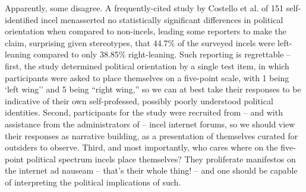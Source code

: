 \documentclass[11pt]{article}
\begin{document}
{%
\vspace*{\parskip}
\vbox{
    Apparently, some disagree. A frequently-cited study by Costello et al. of 151 self-identified incel men\footnotemark[\thefootnote] asserted no statistically significant differences in \small political orientation when compared to non-incels, leading some reporters to make the claim, surprising given stereotypes, that 44.7\% of the surveyed incels were left-leaning compared to only 38.85\% right-leaning. Such reporting is regrettable \footnotesize -- first, the study determined political orientation by a single test item, in which participants were asked to place themselves on a five-point scale, with 1 being `left wing'' and 5 being ``right wing,'' so we can at best take their responses to be indicative of their own self-professed, possibly poorly understood political identities. \scriptsize Second, participants for the study were recruited from -- and with assistance from the administrators of -- incel internet forums, so we should view their responses as narrative building, as a presentation of themselves \tiny curated for outsiders to observe. Third, and most importantly, who cares where on the five-point political spectrum incels place themselves? They proliferate manifestos on the internet ad nauseam -- that's their whole thing! -- and one should be capable of interpreting the political implications of such.
\footnotemark[\thefootnote]%
}%
\addtocounter{footnote}{-1}
%
}
\end{document}

